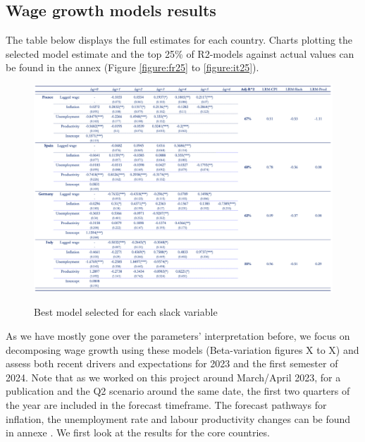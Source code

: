 \newpage
\subsection{Wage growth models results}

The table below displays the full estimates for each country. 
Charts plotting the selected model estimate and the top 25\% of R2-models against actual values can be found in the annex (Figure \ref{figure:fr25} to \ref{figure:it25}).

\begin{figure}[H]
    \centering
    \caption{Best model selected for each slack variable}
    \includegraphics[width=1\textwidth]{Core/2.Labour/img/labour_results.png}
    \label{figure:labour_results}
\end{figure}
\vspace{-1cm}
As we have mostly gone over the parameters’ interpretation before, we focus on decomposing wage growth using these models (Beta-variation figures X to X) and assess both recent drivers and expectations for 2023 and the first semester of 2024. 
Note that as we worked on this project around March/April 2023, for a publication and the Q2 scenario around the same date, the first two quarters of the year are included in the forecast timeframe. 
The forecast pathways for inflation, the unemployment rate and labour productivity changes can be found in annexe . 
We first look at the results for the core countries.

